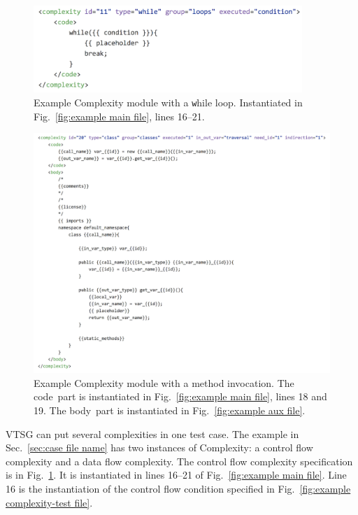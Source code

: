 \begin{figure}[htbp]
  \includegraphics[width=4in]{fig_Complexity_file_while.png}
  \caption{Example Complexity module with a {\texttt while} loop.  Instantiated in 
    Fig.~\ref{fig:example main file}, lines 16--21.}
  \label{fig:example complexity-while file}
\end{figure}

\begin{figure}[htbp]
  \includegraphics[width=\linewidth]{fig_Complexity_file_method.png}
  \caption{Example Complexity module with a method invocation.  
  The \texlangle code\texrangle\  part is instantiated in
  Fig.~\ref{fig:example main file}, lines 18 and 19. 
  The \texlangle body\texrangle\  part is instantiated in
  Fig.~\ref{fig:example aux file}.}
  \label{fig:example complexity-method file}
\end{figure}

VTSG can put several complexities in one test case.
The example in Sec.~\ref{sec:case file name} has two instances of
Complexity: a control flow complexity and a data flow complexity. 
The control flow complexity specification is in 
Fig.~\ref{fig:example complexity-while file}.  It is instantiated in 
lines 16--21 of
Fig.~\ref{fig:example main file}.  Line 16 is the instantiation of 
the control flow condition
specified in Fig.~\ref{fig:example complexity-test file}.


